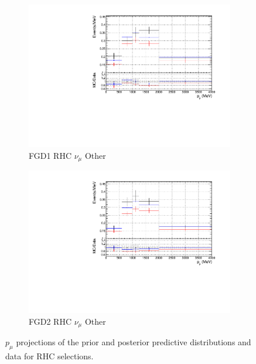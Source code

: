 \begin{figure}[!htbp]
\begin{subfigure}{0.49\textwidth}
  \centering
  \includegraphics[width=\textwidth]{figs/priorpred1D_p_FGD1_NuMuBkg_CCOther_in_AntiNu_Mode}
  \caption{FGD1 RHC $\nu_{\mu}$ Other}
\end{subfigure}
\begin{subfigure}{0.49\textwidth}
  \centering
  \includegraphics[width=\textwidth]{figs/priorpred1D_p_FGD2_NuMuBkg_CCOther_in_AntiNu_Mode}
  \caption{FGD2 RHC $\nu_{\mu}$ Other}
\end{subfigure}
\caption{$p_{\mu}$ projections of the prior and posterior predictive distributions and data for RHC \numu selections.}
\label{fig:priorpost_rhc_numu_p}
\end{figure}

